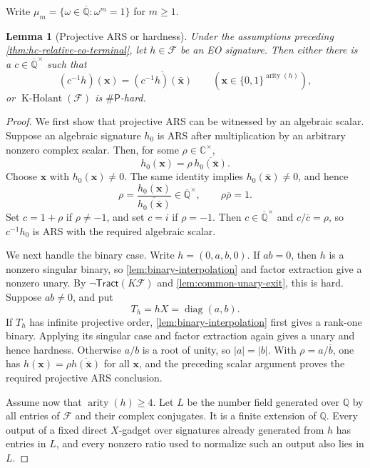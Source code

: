 \documentclass[11pt,letterpaper,onecolumn]{article}
\theoremstyle{plain}
\newtheorem{lemma}[lemma]{Lemma}
\theoremstyle{definition}
\theoremstyle{remark}
\newcommand{\AlgNums}{\overline{\mathbb Q}}
\newcommand{\cF}{\mathcal F}
\newcommand{\KHolant}{\operatorname{K\text{-}Holant}}
\newcommand{\Tract}{\mathsf{Tract}}
\newcommand{\SharpP}{\#\mathsf P}
\newcommand{\arity}{\operatorname{arity}}
\begin{document}
	Write \(\mu_m=\{\omega\in\AlgNums:\omega^m=1\}\) for \(m\ge1\).

	\begin{lemma}[Projective ARS or hardness]
		\label{lem:hc-rel-mwx}
		Under the assumptions preceding \cref{thm:hc-relative-eo-terminal}, let \(h\in\cF\) be an
		EO signature.  Then either there is a
		\(c\in\AlgNums^\times\) such that
		\[
		(c^{-1}h)({\mathbf x})=\overline{(c^{-1}h)(\bar {\mathbf x})}
		\qquad({\mathbf x}\in\{0,1\}^{\arity(h)}),
		\]
		or \(\KHolant(\cF)\) is \(\SharpP\)-hard.
	\end{lemma}
	
	\begin{proof}
		We first show that projective ARS can be witnessed by an algebraic
		scalar.  Suppose an algebraic signature \(h_0\) is
		ARS after multiplication by an arbitrary nonzero complex scalar.  Then, for
		some \(\rho\in\mathbb C^\times\),
		\[
		h_0({\mathbf x})=\rho\,\overline{h_0(\bar {\mathbf x})}.
		\]
		Choose \({\mathbf x}\) with \(h_0({\mathbf x})\ne0\).  The same identity implies
		\(h_0(\bar {\mathbf x})\ne0\), and hence
		\[
		\rho=\frac{h_0({\mathbf x})}{\overline{h_0(\bar {\mathbf x})}}\in\AlgNums^\times,
		\qquad \rho\overline\rho=1.
		\]
		Set \(c=1+\rho\) if \(\rho\ne-1\), and set \(c=i\) if
		\(\rho=-1\).  Then \(c\in\AlgNums^\times\) and
        \(c/\overline c=\rho\), so \(c^{-1}h_0\) is ARS with the required
        algebraic scalar.
		
		We next handle the binary case.  Write \(h=(0,a,b,0)\).  If \(ab=0\), then \(h\) is a
		nonzero singular binary, so \cref{lem:binary-interpolation} and factor
		extraction give a nonzero unary.  By \(\neg\Tract(K\cF)\) and
		\cref{lem:common-unary-exit}, this is hard.  Suppose \(ab\ne0\), and put
		\[
		T_h=hX=\operatorname{diag}(a,b).
		\]
		If \(T_h\) has infinite projective order, \cref{lem:binary-interpolation}
		first gives a rank-one binary. Applying its singular case and factor
		extraction again gives a unary and hence hardness.  Otherwise \(a/b\) is a
		root of unity, so \(|a|=|b|\).  With
		\(\rho=a/\overline b\), one has
		\(h({\mathbf x})=\rho\overline{h(\bar {\mathbf x})}\) for all \({\mathbf x}\), and the preceding scalar
		argument proves the required projective ARS conclusion.
		
        Assume now that \(\arity(h)\ge4\). Let \(L\) be the number field generated
		over \(\mathbb Q\) by all entries of \(\cF\) and their complex conjugates.
		It is a finite extension of \(\mathbb Q\).  Every output of a fixed direct
		\(X\)-gadget over signatures already generated from \(h\) has entries in
		\(L\), and every nonzero ratio used to normalize such an output also lies in
		\(L\).
		

\end{proof}
\end{document}
